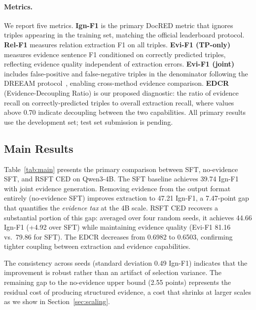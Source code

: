 \paragraph{Metrics.}
We report five metrics. \textbf{Ign-F1} is the primary DocRED metric that ignores triples appearing in the training set, matching the official leaderboard protocol. \textbf{Rel-F1} measures relation extraction F1 on all triples. \textbf{Evi-F1 (TP-only)} measures evidence sentence F1 conditioned on correctly predicted triples, reflecting evidence quality independent of extraction errors. \textbf{Evi-F1 (joint)} includes false-positive and false-negative triples in the denominator following the DREEAM protocol~\citep{ma2023dreeam}, enabling cross-method evidence comparison. \textbf{EDCR} (Evidence-Decoupling Ratio) is our proposed diagnostic: the ratio of evidence recall on correctly-predicted triples to overall extraction recall, where values above 0.70 indicate decoupling between the two capabilities. All primary results use the development set; test set submission is pending.


\subsection{Main Results}
\label{sec:main_results}

Table~\ref{tab:main} presents the primary comparison between SFT, no-evidence SFT, and RSFT CED on Qwen3-4B. The SFT baseline achieves 39.74 Ign-F1 with joint evidence generation. Removing evidence from the output format entirely (no-evidence SFT) improves extraction to 47.21 Ign-F1, a 7.47-point gap that quantifies the \emph{evidence tax} at the 4B scale. RSFT CED recovers a substantial portion of this gap: averaged over four random seeds, it achieves 44.66 Ign-F1 (+4.92 over SFT) while maintaining evidence quality (Evi-F1 81.16 vs.\ 79.86 for SFT). The EDCR decreases from 0.6982 to 0.6503, confirming tighter coupling between extraction and evidence capabilities.

The consistency across seeds (standard deviation 0.49 Ign-F1) indicates that the improvement is robust rather than an artifact of selection variance. The remaining gap to the no-evidence upper bound (2.55 points) represents the residual cost of producing structured evidence, a cost that shrinks at larger scales as we show in Section~\ref{sec:scaling}.

